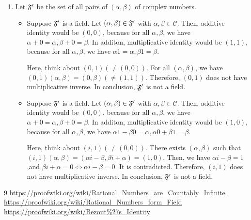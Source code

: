 \documentclass{article}
\newcommand\C{\mathcal C}
\begin{document}
\begin{enumerate}[label = (\alph*)]
\begin{enumerate}[label=(\Alph*)]
\begin{enumerate}[label=(\arabic*)]
\end{enumerate}
\item $(\alpha_1,\beta_1)((\alpha_2,\beta_2) + (\alpha_3,\beta_3)) = (\alpha_1,\beta_1)(\alpha_2+\alpha_3,\beta_2+\beta_3) = (\alpha_1\alpha_2 + \alpha_1\alpha_3-\beta_1\beta_2-\beta_1\beta_3,\alpha_1\beta_2+\alpha_1\beta_3+\beta_1\alpha_2+\beta_1\alpha_3) = (\alpha_1\alpha_2 - \beta_1\beta_2,\alpha_1\beta_2 + \beta_1\alpha_2) + (\alpha_1\alpha_3 - \beta_1\beta_3,\alpha_1\beta_3 + \alpha_3\beta_1) = (\alpha_1,\beta_1)(\alpha_2,\beta_2) + (\alpha_1,\beta_1)(\alpha_3,\beta_3)$.(distributive law stands)
\end{enumerate}
\item
Let $\mathfrak F'$ be the set of all pairs of $(\alpha,\beta)$ of complex numbers.
\begin{itemize}
\item[(a)]
Suppose $\mathfrak F'$ is a field.
Let $(\alpha,\beta) \in \mathfrak F'$ with $\alpha,\beta \in \C$. 
Then, additive identity would be $(0,0)$, because for all $\alpha,\beta$, we have $\alpha + 0 = \alpha, \beta + 0 = \beta$.
In additon, multiplicative identity would be $(1,1)$, because for all $\alpha,\beta$, we have $\alpha1 = \alpha, \beta1 = \beta$.

Here, think about $(0,1) (\ne (0,0))$.
For all $(\alpha, \beta)$, we have $(0,1)(\alpha, \beta) = (0, \beta) (\ne (1,1))$. Therefore, $(0,1)$ does not have multiplicative inverse.
In conclusion, $\mathfrak F'$ is not a field. 
\item[(b)]
Suppose $\mathfrak F'$ is a field.
Let $(\alpha,\beta) \in \mathfrak F'$ with $\alpha, \beta \in \C$. 
Then, additive identity would be $(0,0)$, because for all $\alpha,\beta$, we have $\alpha + 0 = \alpha, \beta + 0 = \beta$.
In additon, multiplicative identity would be $(1,0)$, because for all $\alpha,\beta$, we have $\alpha1 - \beta0 = \alpha, \alpha0 + \beta1 = \beta$.

Here, think about $(i,1) (\ne (0,0))$.
There exists $(\alpha, \beta)$ such that $(i,1)(\alpha, \beta) = (\alpha i -\beta, \beta i + \alpha) = (1,0)$. 
Then, we have $\alpha i -\beta = 1$,and $\beta i + \alpha = 0 \iff \alpha i -\beta = 0$. It is contradicted.
Therefore, $(i,1)$ does not have multiplicative inverse.
In conclusion, $\mathfrak F'$ is not a field. 
\end{itemize}
\end{enumerate}



\begin{thebibliography}{9}
 \url{https://proofwiki.org/wiki/Rational_Numbers_are_Countably_Infinite}
 \url{https://proofwiki.org/wiki/Rational_Numbers_form_Field}
 \url{https://proofwiki.org/wiki/Bezout\%27s_Identity}
\end{thebibliography}
\end{document}
